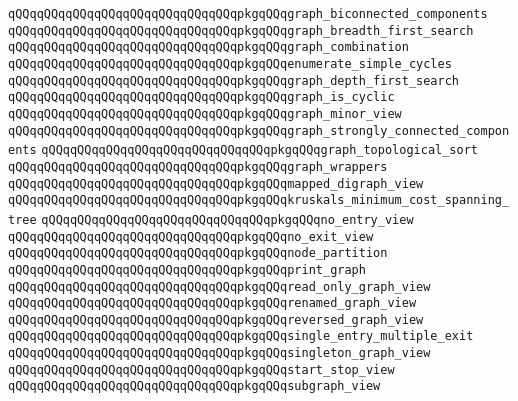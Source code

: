 \verb|qQQqqQQqqQQqqQQqqQQqqQQqqQQqqQQqpkgqQQqgraph_biconnected_components|\newline
\verb|qQQqqQQqqQQqqQQqqQQqqQQqqQQqqQQqpkgqQQqgraph_breadth_first_search|\newline
\verb|qQQqqQQqqQQqqQQqqQQqqQQqqQQqqQQqpkgqQQqgraph_combination|\newline
\verb|qQQqqQQqqQQqqQQqqQQqqQQqqQQqqQQqpkgqQQqenumerate_simple_cycles|\newline
\verb|qQQqqQQqqQQqqQQqqQQqqQQqqQQqqQQqpkgqQQqgraph_depth_first_search|\newline
\verb|qQQqqQQqqQQqqQQqqQQqqQQqqQQqqQQqpkgqQQqgraph_is_cyclic|\newline
\verb|qQQqqQQqqQQqqQQqqQQqqQQqqQQqqQQqpkgqQQqgraph_minor_view|\newline
\verb|qQQqqQQqqQQqqQQqqQQqqQQqqQQqqQQqpkgqQQqgraph_strongly_connected_components|\newline
\verb|qQQqqQQqqQQqqQQqqQQqqQQqqQQqqQQqpkgqQQqgraph_topological_sort|\newline
\verb|qQQqqQQqqQQqqQQqqQQqqQQqqQQqqQQqpkgqQQqgraph_wrappers|\newline
\verb|qQQqqQQqqQQqqQQqqQQqqQQqqQQqqQQqpkgqQQqmapped_digraph_view|\newline
\verb|qQQqqQQqqQQqqQQqqQQqqQQqqQQqqQQqpkgqQQqkruskals_minimum_cost_spanning_tree|\newline
\verb|qQQqqQQqqQQqqQQqqQQqqQQqqQQqqQQqpkgqQQqno_entry_view|\newline
\verb|qQQqqQQqqQQqqQQqqQQqqQQqqQQqqQQqpkgqQQqno_exit_view|\newline
\verb|qQQqqQQqqQQqqQQqqQQqqQQqqQQqqQQqpkgqQQqnode_partition|\newline
\verb|qQQqqQQqqQQqqQQqqQQqqQQqqQQqqQQqpkgqQQqprint_graph|\newline
\verb|qQQqqQQqqQQqqQQqqQQqqQQqqQQqqQQqpkgqQQqread_only_graph_view|\newline
\verb|qQQqqQQqqQQqqQQqqQQqqQQqqQQqqQQqpkgqQQqrenamed_graph_view|\newline
\verb|qQQqqQQqqQQqqQQqqQQqqQQqqQQqqQQqpkgqQQqreversed_graph_view|\newline
\verb|qQQqqQQqqQQqqQQqqQQqqQQqqQQqqQQqpkgqQQqsingle_entry_multiple_exit|\newline
\verb|qQQqqQQqqQQqqQQqqQQqqQQqqQQqqQQqpkgqQQqsingleton_graph_view|\newline
\verb|qQQqqQQqqQQqqQQqqQQqqQQqqQQqqQQqpkgqQQqstart_stop_view|\newline
\verb|qQQqqQQqqQQqqQQqqQQqqQQqqQQqqQQqpkgqQQqsubgraph_view|\newline
